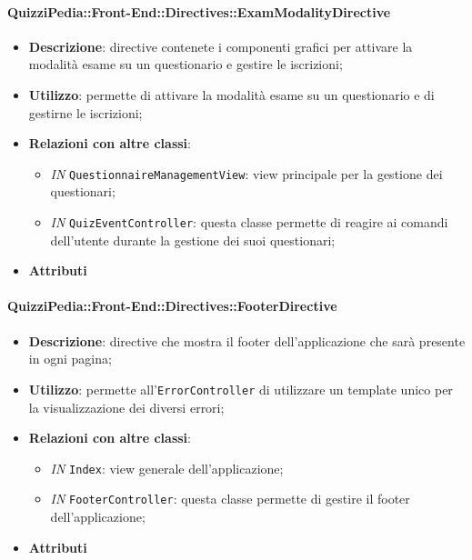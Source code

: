 \paragraph{QuizziPedia::Front-End::Directives::ExamModalityDirective}
\begin{itemize}
	\item \textbf{Descrizione}: directive contenete i componenti grafici per attivare la modalità esame su un questionario e gestire le iscrizioni;
	\item \textbf{Utilizzo}: permette di attivare la modalità esame su un questionario e di gestirne le iscrizioni;
	\item \textbf{Relazioni con altre classi}:
	\begin{itemize}
		\item \textit{IN} \texttt{QuestionnaireManagementView}: view principale per la gestione dei questionari;
		\item \textit{IN} \texttt{QuizEventController}: questa classe permette di reagire ai comandi dell'utente durante la gestione dei suoi questionari;
	\end{itemize}
	\item \textbf{Attributi}
\end{itemize}

\paragraph{QuizziPedia::Front-End::Directives::FooterDirective}
\begin{itemize}
	\item \textbf{Descrizione}: directive che mostra il footer dell'applicazione che sarà presente in ogni pagina;
	\item \textbf{Utilizzo}: permette all'\texttt{ErrorController} di utilizzare un template unico per la visualizzazione dei diversi errori;
	\item \textbf{Relazioni con altre classi}:
	\begin{itemize}
		\item \textit{IN} \texttt{Index}: view generale dell'applicazione;
		\item \textit{IN} \texttt{FooterController}: questa classe permette di gestire il footer dell'applicazione;
	\end{itemize}
	\item \textbf{Attributi}
\end{itemize}

